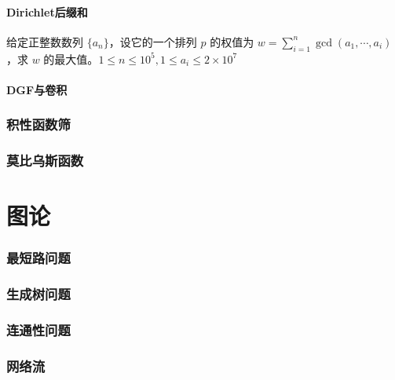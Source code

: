 \documentclass[12pt,a4paper]{article}
\begin{document}
\subsection{Dirichlet后缀和}
\begin{mdframed}[leftline=true, linewidth=2pt, linecolor=gray]
	给定正整数数列 $\{a_n\}$，设它的一个排列 $p$ 的权值为 $w=\displaystyle \sum_{i=1}^{n}\gcd(a_1,\cdots,a_i)$，求 $w$ 的最大值。$1\le n\le10^5,1\le a_i\le2\times10^7$
\end{mdframed}
\subsection{DGF与卷积}

\newpage
\section{积性函数筛}

\newpage
\section{莫比乌斯函数}

\newpage
\part{图论} %
\section{最短路问题}
\newpage
\section{生成树问题}
\newpage
\section{连通性问题}
\newpage
\section{网络流}
\end{document}
